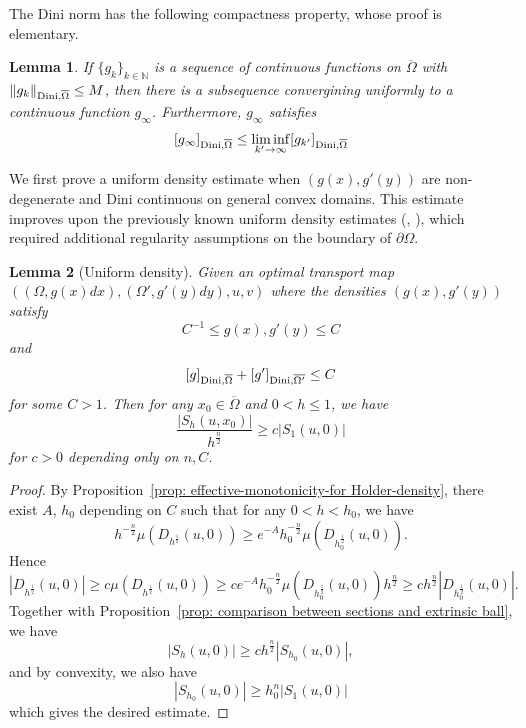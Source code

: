 \documentclass[12pt,reqno]{amsart}
\newtheorem{lem}{Lemma}[section]
\numberwithin{equation}{section}
\begin{document}
    The Dini norm has the following compactness property, whose proof is elementary.
    \begin{lem}\label{lem: Dini-compactness}
    If $\{g_k\}_{k\in \mathbb{N}}$ is a sequence of continuous functions on $\overline{\Omega}$ with $\|g_k\|_{{\rm Dini},\overline{\Omega}} \leq M$, then there is a subsequence convergining uniformly to a continuous function $g_{\infty}$.  Furthermore, $g_{\infty}$ satisfies
    \[
    [g_\infty]_{{\rm Dini},\overline{\Omega}} \leq \liminf_{k'\rightarrow \infty}[g_{k'}]_{{\rm Dini}, \overline{\Omega}}
    \]
    \end{lem}

    We first prove a uniform density estimate when $(g(x), g'(y))$ are non-degenerate and Dini continuous on general convex domains. This estimate improves upon the previously known uniform density estimates (\cite[Section 3]{Caffarelli3}, \cite[Section 2]{Chen-Liu-Wang}), which required additional regularity assumptions on the boundary of $\partial\Omega$.  

    \begin{lem}[Uniform density]\label{lem: uniform density}
    Given an optimal transport map $((\Omega, g(x)dx), (\Omega', g'(y)dy), u, v)$ where the densities $(g(x), g'(y))$ satisfy
	\[C^{-1}\leq g(x), g'(y)\leq C\]
	and
	\[[g]_{{\rm Dini}, \overline{\Omega}}+[g']_{{\rm Dini}, \overline{\Omega'}}\leq C\]
    for some $C>1$. Then for any $x_0\in \overline\Omega$ and $0<h\leq 1$, we have
    \[\frac{|S_h(u, x_0)|}{h^{\frac n 2}}\geq c|S_1(u, 0)|\]
    for $c>0$ depending only on $n, C$. 
\end{lem}
    \begin{proof}
        By Proposition~\ref{prop: effective-monotonicity-for Holder-density}, there exist $A$, $h_0$ depending on $C$ such that for any $0<h<h_0$, we have 
        \[h^{-\frac n 2}\mu(D_{h^{\frac 1 2}}(u, 0))\geq e^{-A}h_0^{-\frac n 2}\mu(D_{h_0^{\frac 1 2}}(u, 0)).\]
        Hence
        \[|D_{h^{\frac 1 2}}(u, 0)|\geq c\mu(D_{h^{\frac 1 2}}(u, 0))\geq ce^{-A}h_0^{-\frac n 2}\mu(D_{h_0^{\frac 1 2}}(u, 0))h^{\frac n 2}\geq ch^{\frac n 2}|D_{h_0^{\frac 1 2}}(u, 0)|.\]
        Together with Proposition~\ref{prop: comparison between sections and extrinsic ball}, we have
        \[|S_h(u, 0)|\geq ch^{\frac n 2}|S_{h_0}(u, 0)|,\]
        and by convexity, we also have
        \[|S_{h_0}(u, 0)|\geq h_0^{n}|S_1(u, 0)|\]
        which gives the desired estimate. 
    \end{proof}
\end{document}
